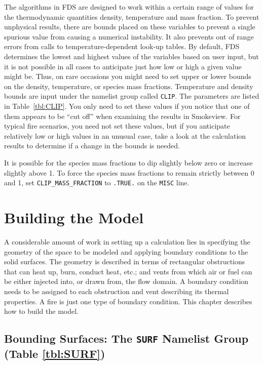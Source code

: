 \documentclass[11pt]{book}
\newcommand{\ct}{\tt\small}
\begin{document}
The algorithms in FDS are designed to work within a certain range of values for the thermodynamic quantities density, temperature and mass fraction. To prevent unphysical results,
there are bounds placed on these variables to prevent a single spurious value from causing a numerical instability. It also prevents out of range
errors from calls to temperature-dependent look-up tables. By default, FDS determines the lowest and highest values of the variables based on user input, but it is not
possible in all cases to anticipate just how low or high a given value might be. Thus,
on rare occasions you might need to set upper or lower bounds on the density, temperature, or species mass fractions. Temperature and density bounds are input under the
namelist group called {\ct CLIP}. The parameters are listed in Table~\ref{tbl:CLIP}. You only need to set these values if you notice that one of them appears to be
``cut off'' when examining the results in Smokeview. For typical fire scenarios, you need not set these values, but if you anticipate relatively low or high values in an
unusual case, take a look at the calculation results to determine if a change in the bounds is needed.

It is possible for the species mass fractions to dip slightly below zero or increase slightly above 1. To force the species mass fractions to remain strictly between 0 and 1, set {\ct CLIP\_MASS\_FRACTION} to {\ct .TRUE.} on the {\ct MISC} line.








\chapter{Building the Model}

A considerable amount of work in setting up a calculation lies in specifying the
geometry of the space to be modeled and applying boundary conditions
to the solid surfaces. The geometry is described in terms
of rectangular obstructions that can heat up, burn, conduct heat, etc.;
and vents from which air or fuel can be
either injected into, or drawn from, the flow domain.
A boundary condition needs to be assigned to each obstruction
and vent describing its thermal properties. A fire is just one type of
boundary condition. This chapter describes how to build the model.


\section{Bounding Surfaces: The \texorpdfstring{{\tt SURF}}{SURF} Namelist Group (Table \ref{tbl:SURF})}
\label{info:SURF}
\end{document}
